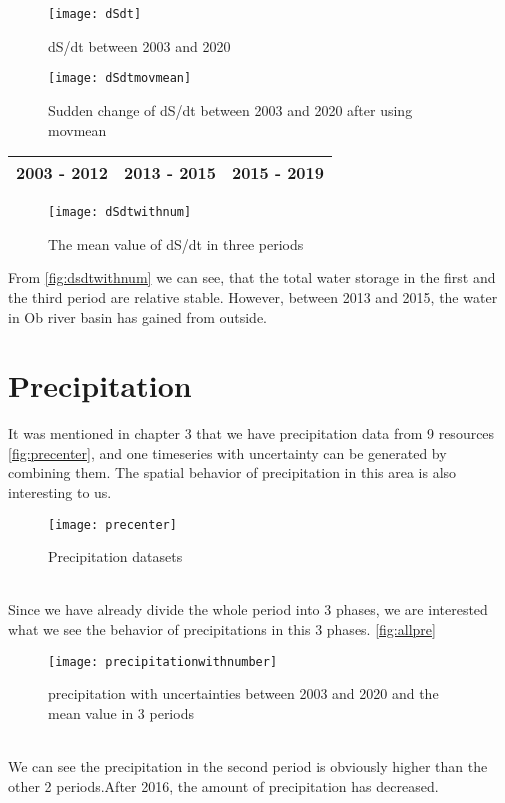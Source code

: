 \begin{figure}[htbp]
	\centering
	\texttt{[image: dSdt]} %
	\caption{dS/dt between 2003 and 2020} 
	\label{fig:dsdtall}
\end{figure}
\begin{figure}[htbp]
	\centering
	\texttt{[image: dSdtmovmean]} %
	\caption{Sudden change of dS/dt between 2003 and 2020 after using movmean} 
	\label{fig:dsdtmovmean}
\end{figure}
\begin{table}[htbp] \centering
	\begin{tabular}{|l|l|l|}
		\hline
		2003 - 2012 & 2013 - 2015 & 2015 - 2019 \\ \hline
	\end{tabular}
\end{table}
\begin{figure}[htbp]
	\centering
	\texttt{[image: dSdtwithnum]} %
	\caption{The mean value of dS/dt in three periods} 
	\label{fig:dsdtwithnum}
\end{figure}
From \autoref{fig:dsdtwithnum} we can see, that the total water storage in the first and the third period are relative stable. However, between 2013 and 2015, the water in Ob river basin has gained from outside. 
\clearpage
\section{Precipitation}
It was mentioned in chapter 3 that we have precipitation data from 9 resources \autoref{fig:precenter}, and one timeseries with uncertainty can be generated by combining them. The spatial behavior of precipitation in this area is also interesting to us. 
\begin{figure}[htbp]
	\centering
	\texttt{[image: precenter]} %
	\caption{Precipitation datasets} 
	\label{fig:precenter}
\end{figure}
\\
Since we have already divide the whole period into 3 phases, we are interested what we see the behavior of precipitations in this 3 phases. \autoref{fig:allpre}
\begin{figure}[htbp]
	\centering
	\texttt{[image: precipitationwithnumber]} %
	\caption{precipitation with uncertainties between 2003 and 2020 and the mean value in 3 periods} 
	\label{fig:allpre}
\end{figure}
\\
We can see the precipitation in the second period is obviously higher than the other 2 periods.After 2016, the amount of precipitation has decreased. 
\clearpage
